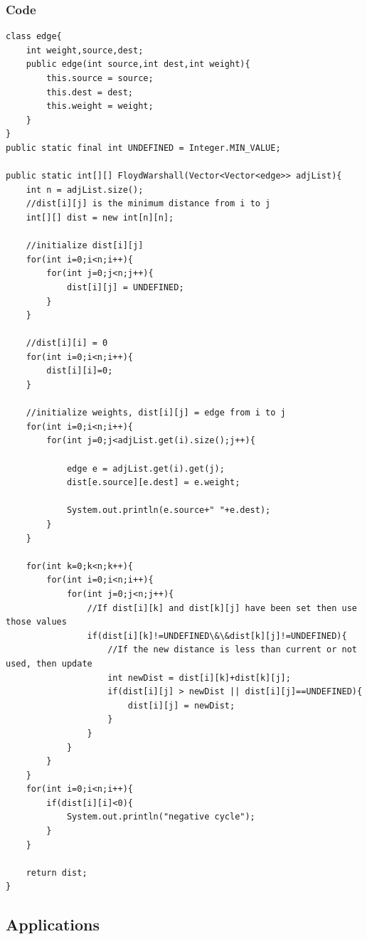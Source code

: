 \documentclass[11pt,oneside]{book}
\begin{document}
\subsubsection{Code}

\begin{lstlisting}
class edge{
    int weight,source,dest;
    public edge(int source,int dest,int weight){
        this.source = source;
        this.dest = dest;
        this.weight = weight;
    }
}
public static final int UNDEFINED = Integer.MIN_VALUE;
    
public static int[][] FloydWarshall(Vector<Vector<edge>> adjList){
    int n = adjList.size();
    //dist[i][j] is the minimum distance from i to j
    int[][] dist = new int[n][n];
    
    //initialize dist[i][j]
    for(int i=0;i<n;i++){
        for(int j=0;j<n;j++){
            dist[i][j] = UNDEFINED;
        }
    }
    
    //dist[i][i] = 0
    for(int i=0;i<n;i++){
        dist[i][i]=0;
    }
    
    //initialize weights, dist[i][j] = edge from i to j
    for(int i=0;i<n;i++){
        for(int j=0;j<adjList.get(i).size();j++){
            
            edge e = adjList.get(i).get(j);
            dist[e.source][e.dest] = e.weight;
            
            System.out.println(e.source+" "+e.dest);
        }
    }
    
    for(int k=0;k<n;k++){
        for(int i=0;i<n;i++){
            for(int j=0;j<n;j++){
                //If dist[i][k] and dist[k][j] have been set then use those values
                if(dist[i][k]!=UNDEFINED\&\&dist[k][j]!=UNDEFINED){
                    //If the new distance is less than current or not used, then update
                    int newDist = dist[i][k]+dist[k][j];
                    if(dist[i][j] > newDist || dist[i][j]==UNDEFINED){
                        dist[i][j] = newDist;
                    }
                }
            }
        }
    }
    for(int i=0;i<n;i++){
        if(dist[i][i]<0){
            System.out.println("negative cycle");
        }
    }
    
    return dist;
}
\end{lstlisting}

\subsection{Applications}
\end{document}
